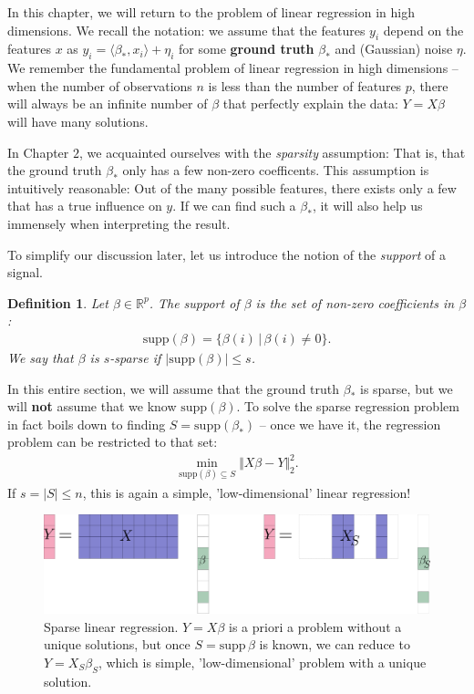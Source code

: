 \documentclass{article}
\newcommand{\sprod}[1]{\langle #1 \rangle}
\newcommand{\R}{\mathbb{R}}
\newcommand{\sse}{\subseteq}
\newtheorem{defi}{Definition}
\newcommand{\abs}[1]{\vert #1 \vert}
\newcommand{\norm}[1]{\Vert #1 \Vert}
\begin{document}
In this chapter, we will return to the problem of linear regression in high dimensions. We recall the notation: we assume that the features $y_i$ depend on the features $x$ as $y_i = \sprod{\beta_*,x_i} +\eta_i$ for some \textbf{ground truth} $\beta_*$ and (Gaussian) noise $\eta$. We remember the fundamental problem of linear regression in high dimensions -- when the number of observations $n$ is less than the number of features $p$, there will always be an infinite number of $\beta$ that perfectly explain the data: $Y=X\beta$ will have many solutions.

In Chapter $2$, we acquainted ourselves with the \emph{sparsity} assumption: That is, that the ground truth $\beta_*$ only has a few non-zero coefficents. This assumption is intuitively reasonable: Out of the many possible features, there exists only a few that has a true influence on $y$. If we can find such a $\beta_*$, it will also help us immensely when interpreting the result.

To simplify our discussion later, let us introduce the notion of the \emph{support} of a signal.
\begin{defi}
    Let $\beta \in \R^p$. The support of $\beta$ is the set of non-zero coefficients in $\beta$:
    \begin{align*}
        \mathrm{supp}(\beta) = \{\beta(i) \, \vert \, \beta(i)\neq 0 \}.
    \end{align*}
    We say that $\beta$ is \emph{$s$-sparse} if $\abs{\mathrm{supp}(\beta)}\leq s$.
\end{defi}

In this entire section, we will assume that the ground truth $\beta_*$ is sparse, but we will \textbf{not} assume that we know $\mathrm{supp}(\beta)$. To solve the sparse regression problem in fact boils down to finding $S=\mathrm{supp}(\beta_*)$ -- once we have it, the regression problem can be restricted to that set:
\begin{align*}
    \min_{\mathrm{supp}(\beta)\sse S} \norm{X\beta-Y}_2^2.
\end{align*}
If $s=\abs{S}\leq n$, this is again a simple, 'low-dimensional' linear regression!

\begin{figure}
    \centering
    \includegraphics[width=0.85\linewidth]{graphics/sparse_regression.png}
    \caption{Sparse linear regression. $Y=X\beta$ is a priori a problem without a unique solutions, but once $S=\mathrm{supp}\, \beta$ is known, we can reduce to $Y=X_S\beta_S$, which is simple, 'low-dimensional' problem with a unique solution.}
    \label{fig:linreg}
\end{figure}
\end{document}
